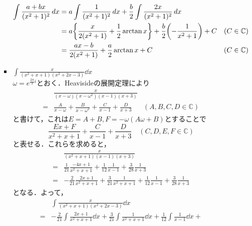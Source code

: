 \begin{enumerate}[(1)]
\begin{enumerate}[(i)]
\begin{itemize}
            \begin{align}
                \int \frac{a+bx}{(x^2+1)^2}\dd{x}
                &=a\int\frac{1}{(x^2+1)^2}\dd{x}+\frac{b}{2}\int\frac{2x}{(x^2+1)^2}\dd{x}\\
                &=a\qty{\frac{x}{2(x^2+1)}+\frac{1}{2}\arctan x}+
                \frac{b}{2}\qty(-\frac{1}{x^2+1})+C& (C\in \mathbb{C})\\
                &=\frac{ax-b}{2(x^2+1)}+\frac{a}{2}\arctan x+C& (C\in \mathbb{C})
            \end{align}
            \item $\displaystyle \int \frac{x}{(x^2+x+1)(x^2+2x-3)}\dd{x}$\\
            $\displaystyle \omega=e^{\frac{2\pi}{3}i}$とおく．Heavisideの展開定理により
            \begin{align}
                &\frac{x}{(x-\omega)(x-\omega^2)(x-1)(x+3)}\\
                =&
                \frac{A}{x-\omega}+
                \frac{B}{x-\omega^2}+
                \frac{C}{x-1}+
                \frac{D}{x+3}& (A,B,C,D\in \mathbb{C})
            \end{align}
            と書けて，これは$E=A+B,F=-\omega(A\omega+B)$とすることで
            \begin{equation}
                \frac{Ex+F}{x^2+x+1}+
                \frac{C}{x-1}+
                \frac{D}{x+3} \quad (C,D,E,F\in \mathbb{C})
            \end{equation}
            と表せる．これらを求めると，
            \begin{align}
                &\frac{x}{(x^2+x+1)(x-1)(x+3)}\\
                =&
                \frac{1}{21}\frac{-4x+1}{x^2+x+1}+
                \frac{1}{12}\frac{1}{x-1}+
                \frac{3}{28}\frac{1}{x+3}\\
                =&
                -\frac{2}{21}\frac{2x+1}{x^2+x+1}+
                \frac{3}{21}\frac{1}{x^2+x+1}+
                \frac{1}{12}\frac{1}{x-1}+
                \frac{3}{28}\frac{1}{x+3}
            \end{align}
            となる．よって，
            \begin{align}
                &\int \frac{x}{(x^2+x+1)(x^2+2x-3)}\dd{x}\\
                =&
                -\frac{2}{21}\int \frac{2x+1}{x^2+x+1}\dd{x}+
                \frac{3}{21}\int \frac{1}{x^2+x+1}\dd{x}+
                \frac{1}{12}\int \frac{1}{x-1}\dd{x}+

\end{align}
\end{itemize}
\end{enumerate}
\end{enumerate}
